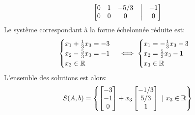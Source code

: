 \begin{exercice}
\begin{enumerate}
\begin{align*}
\begin{bmatrix}
        0 & 1 & -5/3 & \bigm| & -1 \\
        0 & 0 & 0 & \bigm| & 0
        \end{bmatrix}
    \end{align*}
    Le système correspondant à la forme échelonnée réduite est:
    $$\begin{cases}
    x_1 + \frac{1}{3} x_3 = -3 \\
    x_2 - \frac{5}{3}x_3 = -1 \\
    x_3 \in \mathbb{R}
    \end{cases} \iff 
    \begin{cases}
    x_1 = -\frac{1}{3} x_3 -3 \\
    x_2 = \frac{5}{3}x_3 -1 \\
    x_3 \in \mathbb{R}
    \end{cases}$$
    L'ensemble des solutions est alors:
    $$S(A,b) = \left\{ \begin{bmatrix} -3 \\ -1 \\ 0 \end{bmatrix} + x_3 \begin{bmatrix} -1/3 \\ 5/3 \\ 1 \end{bmatrix} \ | \ x_3 \in \R \right\}$$
    \, \\


\end{enumerate}
\end{exercice}
